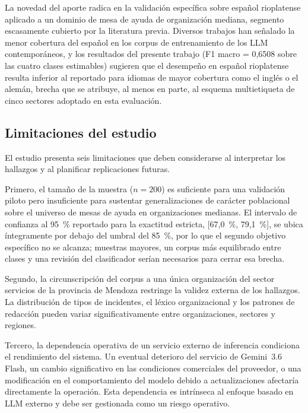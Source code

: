 La novedad del aporte radica en la validación específica sobre español rioplatense aplicado a un dominio de mesa de ayuda de organización mediana, segmento escasamente cubierto por la literatura previa. Diversos trabajos han señalado la menor cobertura del español en los corpus de entrenamiento de los LLM contemporáneos, y los resultados del presente trabajo (F1 macro = 0,6508 sobre las cuatro clases estimables) sugieren que el desempeño en español rioplatense resulta inferior al reportado para idiomas de mayor cobertura como el inglés o el alemán, brecha que se atribuye, al menos en parte, al esquema multietiqueta de cinco sectores adoptado en esta evaluación.

\subsection{Limitaciones del estudio}\label{subsec:limitaciones-estudio}

El estudio presenta seis limitaciones que deben considerarse al interpretar los hallazgos y al planificar replicaciones futuras.

Primero, el tamaño de la muestra (\(n = 200\)) es suficiente para una validación piloto pero insuficiente para sustentar generalizaciones de carácter poblacional sobre el universo de mesas de ayuda en organizaciones medianas. El intervalo de confianza al 95~\% reportado para la exactitud estricta, [67,0~\%, 79,1~\%], se ubica íntegramente por debajo del umbral del 85~\%, por lo que el segundo objetivo específico no se alcanza; muestras mayores, un corpus más equilibrado entre clases y una revisión del clasificador serían necesarios para cerrar esa brecha.

Segundo, la circunscripción del corpus a una única organización del sector servicios de la provincia de Mendoza restringe la validez externa de los hallazgos. La distribución de tipos de incidentes, el léxico organizacional y los patrones de redacción pueden variar significativamente entre organizaciones, sectores y regiones.

Tercero, la dependencia operativa de un servicio externo de inferencia condiciona el rendimiento del sistema. Un eventual deterioro del servicio de Gemini~3.6 Flash, un cambio significativo en las condiciones comerciales del proveedor, o una modificación en el comportamiento del modelo debido a actualizaciones afectaría directamente la operación. Esta dependencia es intrínseca al enfoque basado en LLM externo y debe ser gestionada como un riesgo operativo.

